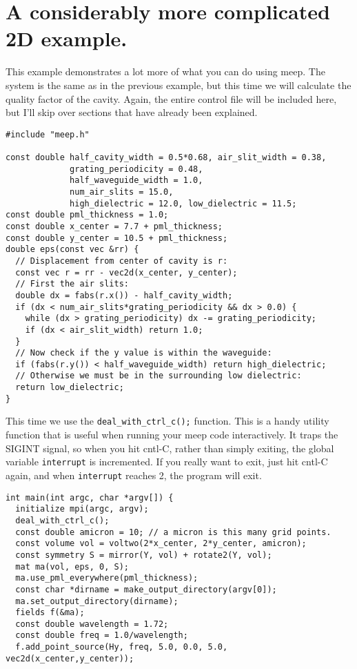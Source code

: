 \begin{comment}
/*
\end{comment}
\section{A considerably more complicated 2D example.}
\begin{comment}
*/
\end{comment}

This example demonstrates a lot more of what you can do using meep.  The
system is the same as in the previous example, but this time we will
calculate the quality factor of the cavity.  Again, the entire control file
will be included here, but I'll skip over sections that have already been
explained.

\begin{verbatim}
#include "meep.h"

const double half_cavity_width = 0.5*0.68, air_slit_width = 0.38,
             grating_periodicity = 0.48,
             half_waveguide_width = 1.0,
             num_air_slits = 15.0,
             high_dielectric = 12.0, low_dielectric = 11.5;
const double pml_thickness = 1.0;
const double x_center = 7.7 + pml_thickness;
const double y_center = 10.5 + pml_thickness;
double eps(const vec &rr) {
  // Displacement from center of cavity is r:
  const vec r = rr - vec2d(x_center, y_center);
  // First the air slits:
  double dx = fabs(r.x()) - half_cavity_width;
  if (dx < num_air_slits*grating_periodicity && dx > 0.0) {
    while (dx > grating_periodicity) dx -= grating_periodicity;
    if (dx < air_slit_width) return 1.0;
  }
  // Now check if the y value is within the waveguide:
  if (fabs(r.y()) < half_waveguide_width) return high_dielectric;
  // Otherwise we must be in the surrounding low dielectric:
  return low_dielectric;
}
\end{verbatim}
This time we use the \verb!deal_with_ctrl_c();! function.  This is a handy
utility function that is useful when running your meep code
interactively.  It traps the SIGINT signal, so when you hit cntl-C, rather
than simply exiting, the global variable \verb!interrupt! is incremented.
If you really want to exit, just hit cntl-C again, and when
\verb!interrupt! reaches 2, the program will exit.
\begin{verbatim}
int main(int argc, char *argv[]) {
  initialize mpi(argc, argv);
  deal_with_ctrl_c();
  const double amicron = 10; // a micron is this many grid points.
  const volume vol = voltwo(2*x_center, 2*y_center, amicron);
  const symmetry S = mirror(Y, vol) + rotate2(Y, vol);
  mat ma(vol, eps, 0, S);
  ma.use_pml_everywhere(pml_thickness);
  const char *dirname = make_output_directory(argv[0]);
  ma.set_output_directory(dirname);
  fields f(&ma);
  const double wavelength = 1.72;
  const double freq = 1.0/wavelength;
  f.add_point_source(Hy, freq, 5.0, 0.0, 5.0, vec2d(x_center,y_center));
\end{verbatim}
